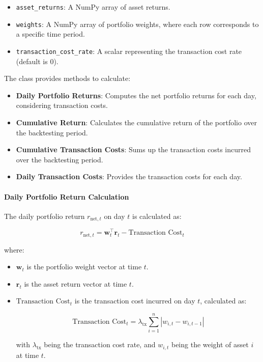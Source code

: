 \begin{itemize}
    \item \texttt{asset\_returns}: A NumPy array of asset returns.
    \item \texttt{weights}: A NumPy array of portfolio weights, where each row corresponds to a specific time period.
    \item \texttt{transaction\_cost\_rate}: A scalar representing the transaction cost rate (default is 0).
\end{itemize}

The class provides methods to calculate:

\begin{itemize}
    \item \textbf{Daily Portfolio Returns}: Computes the net portfolio returns for each day, considering transaction costs.
    \item \textbf{Cumulative Return}: Calculates the cumulative return of the portfolio over the backtesting period.
    \item \textbf{Cumulative Transaction Costs}: Sums up the transaction costs incurred over the backtesting period.
    \item \textbf{Daily Transaction Costs}: Provides the transaction costs for each day.
\end{itemize}

\paragraph{Daily Portfolio Return Calculation}

The daily portfolio return \( r_{\text{net}, t} \) on day \( t \) is calculated as:

\[
r_{\text{net}, t} = \mathbf{w}_t^\top \mathbf{r}_t - \text{Transaction Cost}_t
\]

where:

\begin{itemize}
    \item \( \mathbf{w}_t \) is the portfolio weight vector at time \( t \).
    \item \( \mathbf{r}_t \) is the asset return vector at time \( t \).
    \item \( \text{Transaction Cost}_t \) is the transaction cost incurred on day \( t \), calculated as:

    \[
    \text{Transaction Cost}_t = \lambda_{\text{tx}} \sum_{i=1}^n |w_{i, t} - w_{i, t-1}|
    \]

    with \( \lambda_{\text{tx}} \) being the transaction cost rate, and \( w_{i, t} \) being the weight of asset \( i \) at time \( t \).
\end{itemize}

